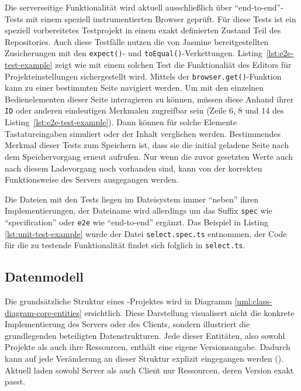 

Die serverseitige Funktionalität wird aktuell ausschließlich über "`end-to-end"'-Tests mit einem speziell instrumentierten Browser geprüft. Für diese Tests ist ein speziell vorbereitetes Testprojekt in einem exakt definierten Zustand Teil des Repositories. Auch diese Testfälle nutzen die von Jasmine bereitgestellten Zusicherungen mit den \texttt{expect()}- und \texttt{toEqual()}-Verkettungen. Listing~\ref{lst:e2e-test-example} zeigt wie mit einem solchen Test die Funktionaliät des Editors für Projekteinstellungen sichergestellt wird. Mittels der \texttt{browser.get()}-Funktion kann zu einer bestimmten Seite navigiert werden. Um mit den einzelnen Bedienelementen dieser Seite interagieren zu können, müssen diese Anhand ihrer \texttt{ID} oder anderen eindeutigen Merkmalen zugreifbar sein (Zeile 6, 8 und 14 des Listing~\ref{lst:e2e-test-example}). Dann können für solche Elemente Tastatureingaben simuliert oder der Inhalt verglichen werden. Bestimmendes Merkmal dieser Tests zum Speichern ist, dass sie die initial geladene Seite nach dem Speichervorgang erneut aufrufen. Nur wenn die zuvor gesetzten Werte auch nach diesem Ladevorgang noch vorhanden sind, kann von der korrekten Funktionsweise des Servers ausgegangen werden.



Die Dateien mit den Tests liegen im Dateisystem immer "`neben"' ihren Implementierungen, der Dateiname wird allerdings um das Suffix \texttt{spec} wie "`specification"' oder \texttt{e2e} wie "`end-to-end"' ergänzt. Das Beispiel in Listing  \ref{lst:unit-test-example} wurde der Datei \texttt{select.spec.ts} entnommen, der Code für die zu testende Funktionalität findet sich folglich in \texttt{select.ts}.

\subsection{Datenmodell}

Die grundsätzliche Struktur eines \idename-Projektes wird in Diagramm \ref{uml:class-diagram-core-entities} ersichtlich. Diese Darstellung visualisert nicht die konkrete Implementierung des Servers oder des Clients, sondern illustriert die grundlegenden beteiligten Datenstrukturen. Jede dieser Entitäten, also sowohl Projekte als auch ihre Ressourcen, enthält eine eigene Versionsangabe. Dadurch kann auf jede Veränderung an dieser Struktur explizit eingegangen werden (). Aktuell laden sowohl Server als auch Client nur Ressourcen, deren Version exakt passt.

